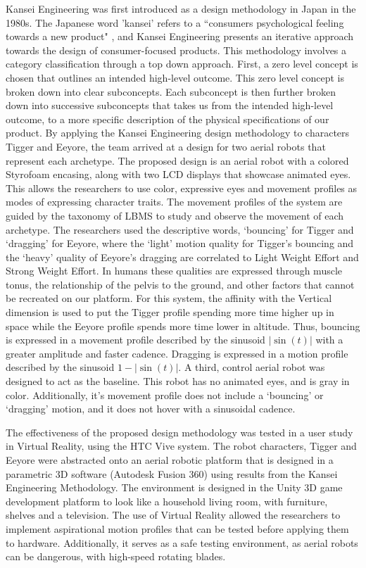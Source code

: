\documentclass[arts,article,submit,moreauthors,pdftex,10pt,a4paper]{mdpi}
\begin{document}
Kansei Engineering was first introduced as a design methodology in Japan in the 1980s. The Japanese word {'}kansei{'} refers to a {``}consumers psychological feeling towards a new product{"} \cite{nagamachi1995kansei}, and Kansei Engineering presents an iterative approach towards the design of consumer-focused products. This methodology involves a category classification through a top down approach. First, a zero level concept is chosen that outlines an intended high-level outcome. This zero level concept is broken down into clear subconcepts. Each subconcept is then further broken down into successive subconcepts that takes us from the intended high-level outcome, to a more specific description of the physical specifications of our product. By applying the Kansei Engineering design methodology to characters Tigger and Eeyore, the team arrived at a design for two aerial robots that represent each archetype. The proposed design is an aerial robot with a colored Styrofoam encasing, along with two LCD displays that showcase animated eyes. This allows the researchers to use color, expressive eyes and movement profiles as modes of expressing character traits. The movement profiles of the system are guided by the taxonomy of LBMS to study and observe the movement of each archetype. The researchers used the descriptive words, {`}bouncing{'} for Tigger and {`}dragging{'} for Eeyore, where the `light' motion quality for Tigger's bouncing and the `heavy' quality of Eeyore's dragging are correlated to Light Weight Effort and Strong Weight Effort. In humans these qualities are expressed through muscle tonus, the relationship of the pelvis to the ground, and other factors that cannot be recreated on our platform. For this system, the affinity with the Vertical dimension is used to put the Tigger profile spending more time higher up in space while the Eeyore profile spends more time lower in altitude. Thus, bouncing is expressed in a movement profile described by the sinusoid $|\sin(t)|$ with a greater amplitude and faster cadence. Dragging is expressed in a motion profile described by the sinusoid $1-|\sin(t)|$. A third, control aerial robot was designed to act as the baseline. This robot has no animated eyes, and is gray in color. Additionally, it's movement profile does not include a {`}bouncing{'} or {`}dragging{'} motion, and it does not hover with a sinusoidal cadence.

The effectiveness of the proposed design methodology was tested in a user study in Virtual Reality, using the HTC Vive system. The robot characters, Tigger and Eeyore were abstracted onto an aerial robotic platform that is designed in a parametric 3D software (Autodesk Fusion 360) using results from the Kansei Engineering Methodology. The environment is designed in the Unity 3D game development platform to look like a household living room, with furniture, shelves and a television. The use of Virtual Reality allowed the researchers to implement aspirational motion profiles that can be tested before applying them to hardware. Additionally, it serves as a safe testing environment, as aerial robots can be dangerous, with high-speed rotating blades.
\end{document}
